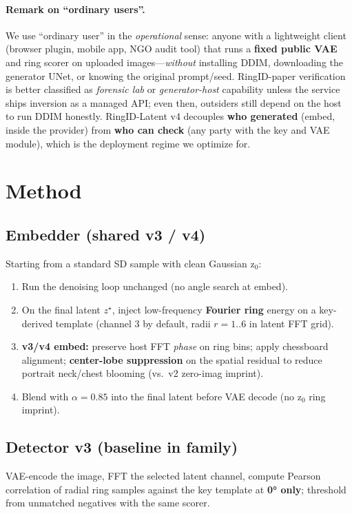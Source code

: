 \documentclass[11pt,a4paper]{article}
\begin{document}
\paragraph{Remark on ``ordinary users''.}
We use ``ordinary user'' in the \emph{operational} sense: anyone with a lightweight client (browser plugin, mobile app, NGO audit tool) that runs a \textbf{fixed public VAE} and ring scorer on uploaded images---\emph{without} installing DDIM, downloading the generator UNet, or knowing the original prompt/seed.
RingID-paper verification is better classified as \emph{forensic lab} or \emph{generator-host} capability unless the service ships inversion as a managed API; even then, outsiders still depend on the host to run DDIM honestly.
RingID-Latent v4 decouples \textbf{who generated} (embed, inside the provider) from \textbf{who can check} (any party with the key and VAE module), which is the deployment regime we optimize for.

\section{Method}

\subsection{Embedder (shared v3 / v4)}
Starting from a standard SD sample with clean Gaussian z$_0$:
\begin{enumerate}[nosep]
  \item Run the denoising loop unchanged (no angle search at embed).
  \item On the final latent $z^\star$, inject low-frequency \textbf{Fourier ring} energy on a key-derived template (channel 3 by default, radii $r{=}1..6$ in latent FFT grid).
  \item \textbf{v3/v4 embed:} preserve host FFT \emph{phase} on ring bins; apply chessboard alignment; \textbf{center-lobe suppression} on the spatial residual to reduce portrait neck/chest blooming (vs.\ v2 zero-imag imprint).
  \item Blend with $\alpha{=}0.85$ into the final latent before VAE decode (no z$_0$ ring imprint).
\end{enumerate}

\subsection{Detector v3 (baseline in family)}
VAE-encode the image, FFT the selected latent channel, compute Pearson correlation of radial ring samples against the key template at \textbf{0° only}; threshold from unmatched negatives with the same scorer.
\end{document}
